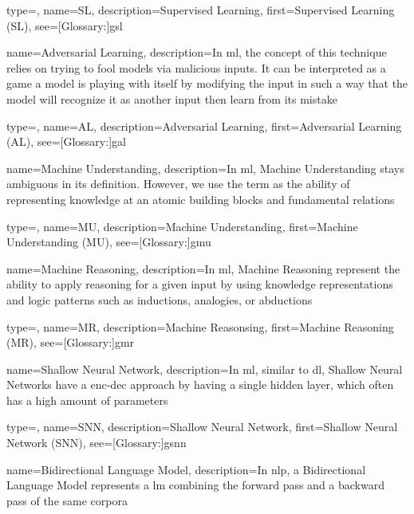 {
  type=\acronymtype,
  name={SL},
  description={Supervised Learning},
  first={Supervised Learning (SL)},
  see=[Glossary:]{gsl}
}

{
  name={Adversarial Learning},
  description={In \gls{ml}, the concept of this technique relies on trying to fool models via malicious inputs. It can be interpreted as a game  a model is playing with itself by modifying the input in such a way that the model will recognize it as another input then learn from its mistake}
}

{
  type=\acronymtype,
  name={AL},
  description={Adversarial Learning},
  first={Adversarial Learning (AL)},
  see=[Glossary:]{gal}
}

{
  name={Machine Understanding},
  description={In \gls{ml}, Machine Understanding stays ambiguous in its definition. However, we use the term as the ability of representing knowledge at an atomic building blocks and fundamental relations}
}

{
  type=\acronymtype,
  name={MU},
  description={Machine Understanding},
  first={Machine Understanding (MU)},
  see=[Glossary:]{gmu}
}

{
  name={Machine Reasoning},
  description={In \gls{ml}, Machine Reasoning represent the ability to apply reasoning for a given input by using knowledge representations and logic patterns such as inductions, analogies, or abductions}
}

{
  type=\acronymtype,
  name={MR},
  description={Machine Reasonsing},
  first={Machine Reasoning (MR)},
  see=[Glossary:]{gmr}
}


{
  name={Shallow Neural Network},
  description={In \gls{ml}, similar to \gls{dl}, Shallow Neural Networks have a \gls{enc-dec} approach by having a single hidden layer, which often has a high amount of parameters}
}

{
  type=\acronymtype,
  name={SNN},
  description={Shallow Neural Network},
  first={Shallow Neural Network (SNN)},
  see=[Glossary:]{gsnn}
}


{
  name={Bidirectional Language Model},
  description={In \gls{nlp}, a Bidirectional Language Model represents a \gls{lm} combining the forward pass and a backward pass of the same corpora}
}

